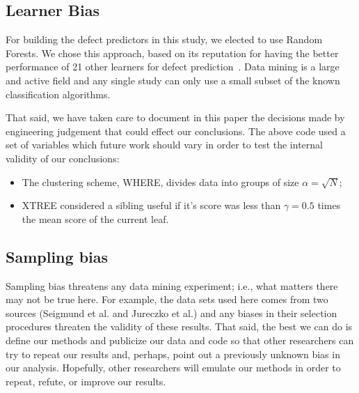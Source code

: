 \documentclass{sig-alternate}
\newcommand{\bi}{\begin{itemize}}
\newcommand{\ei}{\end{itemize}}
\newcommand{\tion}[1]{\textsection\ref{sect:#1}}
\begin{document}

\subsection{ Learner Bias}
For building the defect predictors in this study, we elected
to use  Random Forests. We chose this approach,  based on its reputation for having the better  performance of 21 other learners for defect prediction~\cite{lessmann}. Data mining is a large and active field and any single study can only use a small subset of the known classification algorithms.  

That said, we have taken care to document in this paper the decisions made by engineering
judgement that could effect our conclusions. The above code used a set of variables which future
work should vary in order to test the internal validity of our conclusions:

\bi
\item The clustering scheme, WHERE, divides data into groups of size $\alpha=\sqrt{N}$;
\item XTREE considered a sibling useful if it's score was less than $\gamma=0.5$ times the mean score of the current leaf.
 \ei

\subsection{  Sampling bias} 
Sampling bias threatens any data mining experiment; i.e., what matters
there may not be true here. For example, the data sets used here comes from two sources
(Seigmund et al. and Jureczko et al.) and any biases in their selection procedures
threaten the validity of these results. 
That said,
the best we can do is define our methods and publicize our data and code so that other researchers can
try to repeat our results and, perhaps, point out a previously unknown bias
in our analysis. Hopefully, other researchers will emulate our methods in
order to repeat, refute, or improve our results. 
\end{document}
